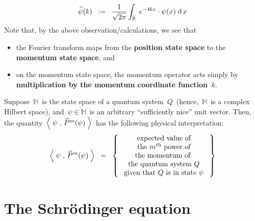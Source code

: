\begin{remark}
\begin{equation*}
\widehat{\psi}(k)
\;\; := \;\;
	\dfrac{1}{\sqrt{2\pi}}
	\int_{\mathbb{R}}\;
		e^{-\,\mathbf{i} kx} \cdot \psi(x)
		\;\textnormal{d}\,x
\end{equation*}
Note that, by the above observation/calculations, we see that
\begin{itemize}
\item
	the Fourier transform maps from the \textbf{position state space}
	to the \textbf{momentum state space}, and
\item
	on the momentum state space, the momentum operator acts simply by
	\textbf{multiplication by the momentum coordinate function \,$k$}.
\end{itemize}
\end{remark}

\vskip 0.3cm
\begin{remark}
\mbox{}
\vskip 0.05cm
\noindent
Suppose \,$\mathbb{H}$\, is the state space of a quantum system \,$Q$\,
(hence, \,$\mathbb{H}$\, is a complex Hilbert space), and
\,$\psi \in \mathbb{H}$\, is an arbitrary ``sufficiently nice'' unit vector.
Then, the quantity
\,$
\left\langle\;
	\overset{{\color{white}.}}{\psi}
	\;,\,
	\widehat{P}^{m}(\psi)
	\;\right\rangle
$\,
has the following physical interpretation:
\begin{equation*}
\left\langle\;
	\overset{{\color{white}.}}{\psi}
	\;,\,
	\widehat{P}^{m}(\psi)
	\;\right\rangle
\;\; = \;\;
	\left\{\;
		\begin{array}{c}
		\textnormal{expected value of}
		\\
		\textnormal{the $m^{\textnormal{th}}$ power of}
		\\
		\textnormal{the momentum of }
		\\
		\textnormal{the quantum system $Q$}
		\\
		\textnormal{given that $Q$ is in state $\psi$}
		\end{array}
		\;\right\}
\end{equation*}
\end{remark}


\vskip 0.5cm
\section{The Schr\"odinger equation}

